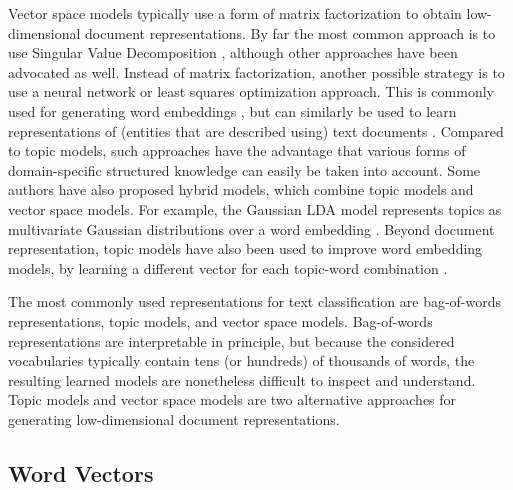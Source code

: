 Vector space models typically use a form of matrix factorization to obtain low-dimensional document representations. By far the most common approach is to use Singular Value Decomposition \cite{ASI:ASI1}, although other approaches have been advocated as well. 
Instead of matrix factorization, another possible strategy is to use a neural network or least squares optimization approach. This is commonly used for generating word embeddings \cite{DBLP:conf/nips/MikolovSCCD13,glove2014}, but can similarly be used to learn representations of (entities that are described using) text documents \cite{DBLP:journals/corr/DaiOL15,van2016learning,DBLP:conf/sigir/JameelBS17}. Compared to topic models, such approaches have the advantage that various forms of domain-specific structured knowledge can easily be taken into account. Some authors have also proposed hybrid models, which combine topic models and vector space models. For example, the Gaussian LDA model represents topics as multivariate Gaussian distributions over a word embedding \cite{DBLP:conf/acl/DasZD15}. Beyond document representation, topic models have also been used to improve word embedding models, by learning a different vector for each topic-word combination \cite{DBLP:conf/aaai/LiuLCS15}. %

The most commonly used representations for text classification are bag-of-words representations, topic models, and vector space models. Bag-of-words representations are interpretable in principle, but because the considered vocabularies typically contain tens (or hundreds) of thousands of words, the resulting learned models are nonetheless difficult to inspect and understand. Topic models and vector space models are two alternative approaches for generating low-dimensional document representations. %

\subsection{Word Vectors}

